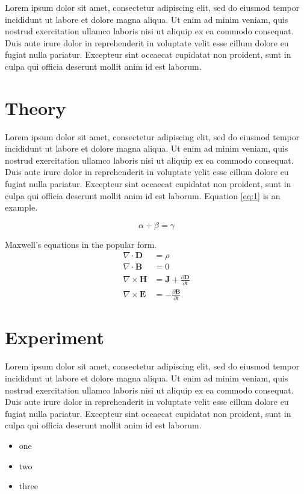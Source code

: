 \documentclass[10pt,twoside,twocolumn,a4paper]{article}
\begin{document}
Lorem ipsum dolor sit amet, consectetur adipiscing elit, sed do eiusmod tempor incididunt ut labore et dolore magna aliqua. Ut enim ad minim veniam, quis nostrud exercitation ullamco laboris nisi ut aliquip ex ea commodo consequat. Duis aute irure dolor in reprehenderit in voluptate velit esse cillum dolore eu fugiat nulla pariatur. Excepteur sint occaecat cupidatat non proident, sunt in culpa qui officia deserunt mollit anim id est laborum. 

\section{Theory}
Lorem ipsum dolor sit amet, consectetur adipiscing elit, sed do eiusmod tempor incididunt ut labore et dolore magna aliqua. Ut enim ad minim veniam, quis nostrud exercitation ullamco laboris nisi ut aliquip ex ea commodo consequat. Duis aute irure dolor in reprehenderit in voluptate velit esse cillum dolore eu fugiat nulla pariatur. Excepteur sint occaecat cupidatat non proident, sunt in culpa qui officia deserunt mollit anim id est laborum. Equation \eqref{eq:1} is an example.

\begin{equation} \label{eq:1}
\alpha + \beta = \gamma
\end{equation}

Maxwell's equations in the popular form.
\begin{align*} \nabla \cdot \mathbf{D} & =  \rho \nonumber\\ 
\nabla \cdot \mathbf{B} & =  0 \\
\nabla \times \mathbf{H} & =  \mathbf{J} + \frac{\partial \mathbf{D}} {\partial t} \\
\nabla \times \mathbf{E} & =  -\frac{\partial \mathbf{B}} {\partial t} 
\end{align*}

\section{Experiment}
Lorem ipsum dolor sit amet, consectetur adipiscing elit, sed do eiusmod tempor incididunt ut labore et dolore magna aliqua. Ut enim ad minim veniam, quis nostrud exercitation ullamco laboris nisi ut aliquip ex ea commodo consequat. Duis aute irure dolor in reprehenderit in voluptate velit esse cillum dolore eu fugiat nulla pariatur. Excepteur sint occaecat cupidatat non proident, sunt in culpa qui officia deserunt mollit anim id est laborum.

\begin{itemize}
\item one
\item two
\item three
\end{itemize}
\end{document}
